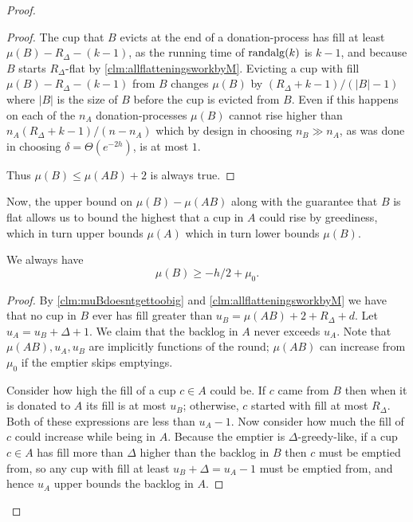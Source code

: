 \begin{proof}
\begin{proof}
  The cup that $B$ evicts at the end of a
  donation-process has fill at least $\mu(B) - R_\Delta -
  (k-1)$, as the running time of $\operatorname{\text{\textup{randalg}}}(k)$ is $k-1$, and
  because $B$ starts $R_\Delta$-flat by
  \cref{clm:allflatteningsworkbyM}. Evicting a cup
  with fill $\mu(B) - R_\Delta - (k -1)$ from $B$ changes
  $\mu(B)$ by $(R_\Delta + k - 1) / (|B|-1)$ where $|B|$ is the
  size of $B$ before the cup is evicted from $B$. Even if this
  happens on each of the $n_A$ donation-processes $\mu(B)$ cannot
  rise higher than $n_A (R_\Delta + k-1) / (n-n_A)$ which by
  design in choosing $n_B\gg n_A$, as was done in
  choosing $\delta = \Theta(e^{-2h})$, is at most $1$.

  Thus $\mu(B) \le \mu(AB) + 2$ is always true.

\end{proof}

Now, the upper bound on $\mu(B)-\mu(AB)$ along with the guarantee
that $B$ is flat allows us to bound the highest that a cup in $A$
could rise by greediness, which in turn upper bounds $\mu(A)$
which in turn lower bounds $\mu(B)$. 
\begin{clm}
  \label{clm:muBgreaterthanminushover2}
  We always have
  $$\mu(B) \ge -h/2 + \mu_0.$$
\end{clm}
\begin{proof}
  By \cref{clm:muBdoesntgettoobig} and \cref{clm:allflatteningsworkbyM} 
  we have that no cup in $B$ ever has fill greater than
  $u_B = \mu(A B) + 2 + R_\Delta + d$. 
  Let $u_A = u_B + \Delta + 1$. We claim that the backlog in $A$
  never exceeds $u_A$. Note that $\mu(AB), u_A, u_B$ are
  implicitly functions of the round; $\mu(AB)$ can increase from
  $\mu_0$ if the emptier skips emptyings.

  Consider how high the fill of a cup $c \in A$ could be.
  If $c$ came from $B$ then when it is donated
  to $A$ its fill is at most $u_B$; otherwise, $c$
  started with fill at most $R_\Delta$. Both of these expressions
  are less than $u_A - 1$. Now consider how
  much the fill of $c$ could increase while being in $A$. Because
  the emptier is $\Delta$-greedy-like, if a cup $c\in A$ has fill
  more than $\Delta$ higher than the backlog in $B$ then $c$ must
  be emptied from, so any cup with fill at least $u_B + \Delta =
  u_A - 1$ must be emptied from, and hence $u_A$ upper bounds the
  backlog in $A$. 


\end{proof}
\end{proof}
